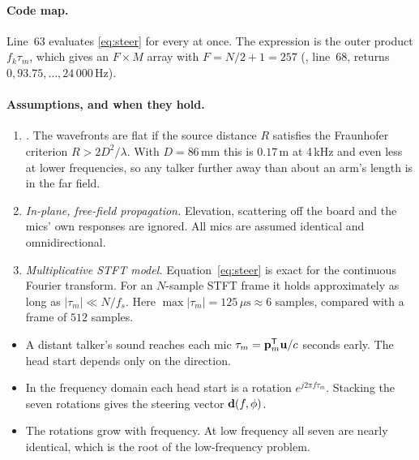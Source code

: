 \documentclass[11pt]{article}
\begin{document}

\paragraph{Code map.} Line~63 evaluates \eqref{eq:steer} for every  at
once. The expression  is the outer product $f_k\tau_m$,
which gives an
$F\times M$ array with $F=N/2+1=257$ (, line~68,
returns $0, 93.75, \dots, 24\,000$\,Hz).

\paragraph{Assumptions, and when they hold.}
\begin{enumerate}
\item \emph{.} The wavefronts are flat if the source distance $R$ satisfies the
  Fraunhofer criterion $R>2D^2/\lambda$. With $D=86$\,mm this is $0.17$\,m at 4\,kHz and
  even less at lower frequencies, so any talker further away than about an arm's length is
  in the far field.
\item \emph{In-plane, free-field propagation.} Elevation, scattering off the board and the
  mics' own responses are ignored. All mics are assumed identical and omnidirectional.
\item \emph{Multiplicative STFT model.} Equation~\eqref{eq:steer} is exact for the continuous
  Fourier transform. For an $N$-sample STFT frame it holds approximately as long as
  $|\tau_m|\ll N/f_s$. Here $\max|\tau_m|=125\,\mu\text{s}\approx6$ samples, compared with a
  frame of $512$ samples.
\end{enumerate}

\begin{takeaways}
\begin{itemize}[nosep]
\item A distant talker's sound reaches each mic $\tau_m=\mathbf{p}_m^{\mathsf T}\mathbf{u}/c$ seconds early. The head
  start depends only on the direction.
\item In the frequency domain each head start is a rotation $e^{j2\pi f\tau_m}$. Stacking the seven
  rotations gives the steering vector $\mathbf{d}(f,\phi)$.
\item The rotations grow with frequency. At low frequency all seven are nearly identical, which
  is the root of the low-frequency problem.
\end{itemize}
\end{takeaways}
\end{document}
